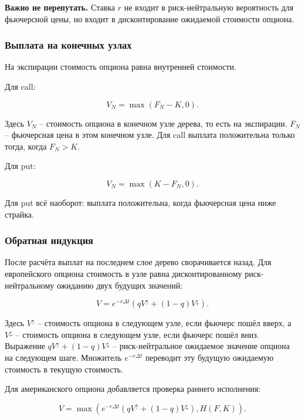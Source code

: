 \documentclass[11pt,a4paper]{article}
\newcommand{\warn}[1]{%
  \vspace{0.15em}
  \noindent\colorbox{softred}{%
    \parbox{\dimexpr\linewidth-2\fboxsep\relax}{\textbf{Важно не перепутать.} #1}%
  }\vspace{0.2em}
}
\begin{document}
\warn{Ставка $r$ не входит в риск-нейтральную вероятность для фьючерсной цены, но входит в дисконтирование ожидаемой стоимости опциона.}

\subsubsection{Выплата на конечных узлах}

На экспирации стоимость опциона равна внутренней стоимости.

Для call:

\begin{equation}
V_N=\max(F_N-K,0).
\end{equation}

Здесь $V_N$ -- стоимость опциона в конечном узле дерева, то есть на экспирации. $F_N$ -- фьючерсная цена в этом конечном узле. Для call выплата положительна только тогда, когда $F_N>K$.

Для put:

\begin{equation}
V_N=\max(K-F_N,0).
\end{equation}

Для put всё наоборот: выплата положительна, когда фьючерсная цена ниже страйка.

\subsubsection{Обратная индукция}

После расчёта выплат на последнем слое дерево сворачивается назад. Для европейского опциона стоимость в узле равна дисконтированному риск-нейтральному ожиданию двух будущих значений:

\begin{equation}
V =
e^{-r\Delta t}
\left(qV^{\uparrow}+(1-q)V^{\downarrow}\right).
\end{equation}

Здесь $V^{\uparrow}$ -- стоимость опциона в следующем узле, если фьючерс пошёл вверх, а $V^{\downarrow}$ -- стоимость опциона в следующем узле, если фьючерс пошёл вниз. Выражение $qV^{\uparrow}+(1-q)V^{\downarrow}$ -- риск-нейтральное ожидаемое значение опциона на следующем шаге. Множитель $e^{-r\Delta t}$ переводит эту будущую ожидаемую стоимость в текущую стоимость.

Для американского опциона добавляется проверка раннего исполнения:

\begin{equation}
V =
\max\left(
e^{-r\Delta t}
\left(qV^{\uparrow}+(1-q)V^{\downarrow}\right),
H(F,K)
\right).
\end{equation}
\end{document}
